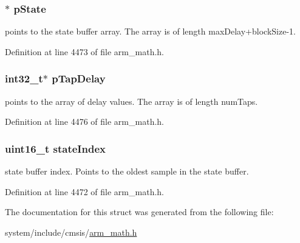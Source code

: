 \subsubsection[{\texorpdfstring{p\+State}{pState}}]{$\ast$ p\+State}\hypertarget{structarm__fir__sparse__instance__q7_aa8f67102521b620af6f259afdcf29785}{}\label{structarm__fir__sparse__instance__q7_aa8f67102521b620af6f259afdcf29785}
points to the state buffer array. The array is of length max\+Delay+block\+Size-\/1. 

Definition at line 4473 of file arm\+\_\+math.\+h.

\subsubsection[{\texorpdfstring{p\+Tap\+Delay}{pTapDelay}}]{\setlength{\rightskip}{0pt plus 5cm}int32\+\_\+t$\ast$ p\+Tap\+Delay}\hypertarget{structarm__fir__sparse__instance__q7_adec00b3793ab4f08edfeb4ea6a9eb6e6}{}\label{structarm__fir__sparse__instance__q7_adec00b3793ab4f08edfeb4ea6a9eb6e6}
points to the array of delay values. The array is of length num\+Taps. 

Definition at line 4476 of file arm\+\_\+math.\+h.

\subsubsection[{\texorpdfstring{state\+Index}{stateIndex}}]{\setlength{\rightskip}{0pt plus 5cm}uint16\+\_\+t state\+Index}\hypertarget{structarm__fir__sparse__instance__q7_a566a0cb53437e48b9a3bf18e5b03d8aa}{}\label{structarm__fir__sparse__instance__q7_a566a0cb53437e48b9a3bf18e5b03d8aa}
state buffer index. Points to the oldest sample in the state buffer. 

Definition at line 4472 of file arm\+\_\+math.\+h.



The documentation for this struct was generated from the following file\+:\begin{DoxyCompactItemize}
\item 
system/include/cmsis/\hyperlink{arm__math_8h}{arm\+\_\+math.\+h}\end{DoxyCompactItemize}

